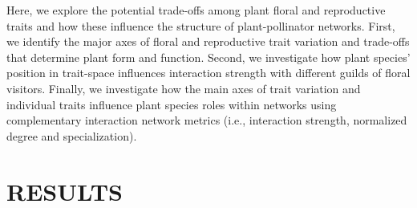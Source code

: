 \documentclass[
  12pt,
  a4paper,
]{article}
\begin{document}
Here, we explore the potential trade-offs among plant floral and reproductive traits and how these influence the structure of plant-pollinator networks. First, we identify the major axes of floral and reproductive trait variation and trade-offs that determine plant form and function. Second, we investigate how plant species' position in trait-space influences interaction strength with different guilds of floral visitors. Finally, we investigate how the main axes of trait variation and individual traits influence plant species roles within networks using complementary interaction network metrics (i.e., interaction strength, normalized degree and specialization).

\hypertarget{results}{%
\section{RESULTS}\label{results}}
\end{document}
